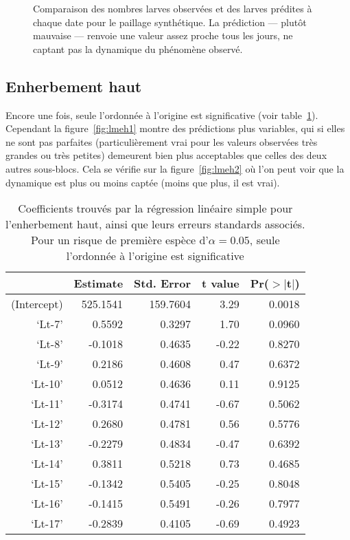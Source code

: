 \documentclass[a4paper, 11pt]{article}
\begin{document}
\begin{figure}[ht]
 \centering
 \caption{Comparaison des nombres larves observées et des larves prédites à chaque date pour le paillage synthétique. La prédiction --- plutôt mauvaise --- renvoie une valeur assez proche tous les jours, ne captant  pas la dynamique du phénomène observé.}
 \label{fig:lmps2}
\end{figure}

\subsection{Enherbement haut}

Encore une fois, seule l'ordonnée à l'origine est significative (voir table~\ref{tab:lmeh}). Cependant la figure~\ref{fig:lmeh1} montre des prédictions plus variables, qui si elles ne sont pas parfaites (particulièrement vrai pour les valeurs observées très grandes ou très petites) demeurent bien plus acceptables que celles des deux autres sous-blocs. Cela se vérifie sur la figure~\ref{fig:lmeh2} où l'on peut voir que la dynamique est plus ou moins captée (moins que plus, il est vrai).

\begin{table}[ht]
\centering
\caption{Coefficients trouvés par la régression linéaire simple pour l'enherbement haut, ainsi que leurs erreurs standards associés. Pour un risque de première espèce d'$\alpha = 0.05$, seule l'ordonnée à l'origine est significative}
\label{tab:lmeh}
\begin{tabular}{rrrrr}
 & Estimate & Std. Error & t value & Pr($>$$|$t$|$) \\ 
  \hline
(Intercept) & 525.1541 & 159.7604 & 3.29 & 0.0018 \\ 
  `Lt-7' & 0.5592 & 0.3297 & 1.70 & 0.0960 \\ 
  `Lt-8' & -0.1018 & 0.4635 & -0.22 & 0.8270 \\ 
  `Lt-9' & 0.2186 & 0.4608 & 0.47 & 0.6372 \\ 
  `Lt-10' & 0.0512 & 0.4636 & 0.11 & 0.9125 \\ 
  `Lt-11' & -0.3174 & 0.4741 & -0.67 & 0.5062 \\ 
  `Lt-12' & 0.2680 & 0.4781 & 0.56 & 0.5776 \\ 
  `Lt-13' & -0.2279 & 0.4834 & -0.47 & 0.6392 \\ 
  `Lt-14' & 0.3811 & 0.5218 & 0.73 & 0.4685 \\ 
  `Lt-15' & -0.1342 & 0.5405 & -0.25 & 0.8048 \\ 
  `Lt-16' & -0.1415 & 0.5491 & -0.26 & 0.7977 \\ 
  `Lt-17' & -0.2839 & 0.4105 & -0.69 & 0.4923 \\ 
\end{tabular}
\end{table}
\end{document}
